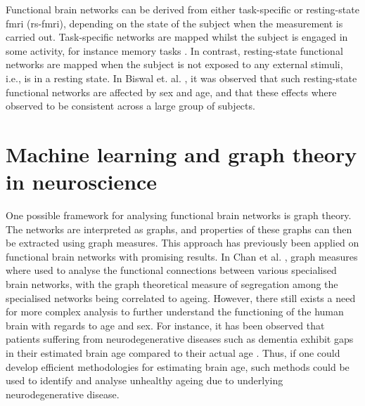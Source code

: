 Functional brain networks can be derived from either task-specific or resting-state \acrshort{fmri} (\acrshort{rs-fmri}), depending on the state of the subject when the measurement is carried out. Task-specific networks are mapped whilst the subject is engaged in some activity, for instance memory tasks \cite{grady}. In contrast, resting-state functional networks are mapped when the subject is not exposed to any external stimuli, i.e., is in a resting state. In Biswal et. al. \cite{biswal}, it was observed that such resting-state functional networks are affected by sex and age, and that these effects where observed to be consistent across a large group of subjects.

\section{Machine learning and graph theory in neuroscience}

One possible framework for analysing functional brain networks is graph theory. The networks are interpreted as graphs, and properties of these graphs can then be extracted using graph measures. This approach has previously been applied on functional brain networks with promising results. In Chan et al. \cite{chan}, graph measures where used to analyse the functional connections between various specialised brain networks, with the graph theoretical measure of segregation among the specialised networks being correlated to ageing. However, there still exists a need for more complex analysis to further understand the functioning of the human brain with regards to age and sex. For instance, it has been observed that patients suffering from neurodegenerative diseases such as dementia exhibit gaps in their estimated brain age compared to their actual age \cite{kaufmann}. Thus, if one could develop efficient methodologies for estimating brain age, such methods could be used to identify and analyse unhealthy ageing due to underlying neurodegenerative disease. 

